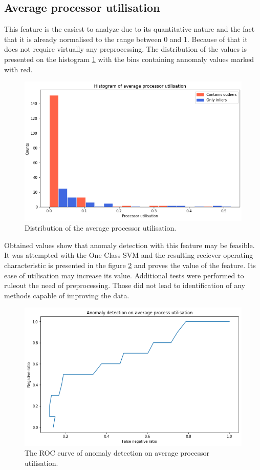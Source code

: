 \documentclass[a4paper,twoside,12pt]{book}
\begin{document}
\subsection{Average processor utilisation}

This feature is the easiest to analyze due to its quantitative nature and the fact that it is
already normalised to the range between 0 and 1. Because of that it does not require virtually 
any preprocessing. The distribution of the values is presented on the 
histogram \ref{fig:histavgproc} with the bins containing annomaly values marked with red. 

\begin{figure}
	\centering
	\includegraphics[scale=0.9]{images/HistAvgProcs}
	\caption{Distribution of the average processor utilisation.}
	\label{fig:histavgproc}
 \end{figure}

Obtained values show that anomaly detection with this feature may be feasible. It was attempted with 
the One Class SVM and the resulting reciever operating characteristic is presented in the figure
\ref{fig:procroc} and proves the value of the feature. Its ease of utilisation may increase its value.
Additional tests were performed to ruleout the need of preprocessing. Those did not lead to identification
of any methods capable of improving the data.

\begin{figure}
	\centering
	\includegraphics[scale=0.9]{images/ProcROCKF}
	\caption{The ROC curve of anomaly detection on average processor utilisation.}
	\label{fig:procroc}
 \end{figure}
\end{document}

